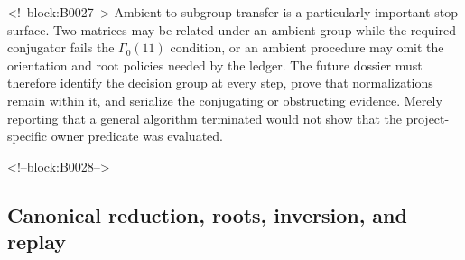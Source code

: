 \documentclass[11pt]{article}
\begin{document}
<!--block:B0027-->
Ambient-to-subgroup transfer is a particularly important stop surface.
Two matrices may be related under an ambient group while the required
conjugator fails the $\Gamma_0(11)$ condition, or an ambient procedure
may omit the orientation and root policies needed by the ledger. The
future dossier must therefore identify the decision group at every
step, prove that normalizations remain within it, and serialize the
conjugating or obstructing evidence. Merely reporting that a general
algorithm terminated would not show that the project-specific owner
predicate was evaluated.

<!--block:B0028-->
\hypertarget{23-canonical-reduction-roots-inversion-and-replay}{%
\subsection{Canonical reduction, roots, inversion, and
replay}\label{23-canonical-reduction-roots-inversion-and-replay}}
\end{document}
